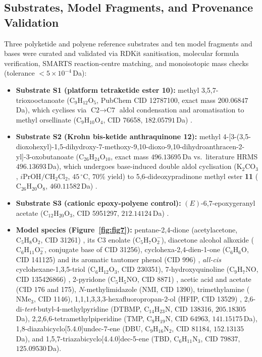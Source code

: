 \documentclass[11pt,a4paper]{article}
\begin{document}
\subsection{Substrates, Model Fragments, and Provenance Validation}
Three polyketide and polyene reference substrates and ten model fragments and bases were curated and validated via RDKit sanitisation, molecular formula verification, SMARTS reaction-centre matching, and monoisotopic mass checks (tolerance $< 5\times 10^{-4}$\,Da):
\begin{itemize}
\item \textbf{Substrate S1 (platform tetraketide ester \textbf{10}):} methyl 3,5,7-trioxooctanoate ($\text{C}_9\text{H}_{12}\text{O}_5$, PubChem CID 12787100, exact mass $200.06847$\,Da), which cyclises via $\text{C2}\to\text{C7}$ aldol condensation and aromatisation to methyl orsellinate ($\text{C}_9\text{H}_{10}\text{O}_4$, CID 76658, $182.05791$\,Da) \cite{harris1975,kleber2020}.
\item \textbf{Substrate S2 (Krohn bis-ketide anthraquinone \textbf{12}):} methyl 4-[3-(3,5-dioxohexyl)-1,5-dihydroxy-7-methoxy-9,10-dioxo-9,10-dihydroanthracen-2-yl]-3-oxobutanoate ($\text{C}_{26}\text{H}_{24}\text{O}_{10}$, exact mass $496.13695$\,Da vs.\ literature HRMS $496.13693$\,Da), which undergoes base-induced double aldol cyclisation ($\text{K}_2\text{CO}_3$, $i\text{PrOH}/\text{CH}_2\text{Cl}_2$, $45\,^\circ\text{C}$, $70\%$ yield) to 5,6-dideoxypradinone methyl ester \textbf{11} ($\text{C}_{26}\text{H}_{20}\text{O}_8$, $460.11582$\,Da) \cite{hayat1999,krohn2000}.
\item \textbf{Substrate S3 (cationic epoxy-polyene control):} $(E)$-6,7-epoxygeranyl acetate ($\text{C}_{12}\text{H}_{20}\text{O}_3$, CID 5951297, $212.14124$\,Da) \cite{corey1995,hess2017}.
\item \textbf{Model species (Figure~\ref{fig:fig7}):} pentane-2,4-dione (acetylacetone, $\text{C}_5\text{H}_8\text{O}_2$, CID 31261) \cite{alagona2010}, its C3 enolate ($\text{C}_5\text{H}_7\text{O}_2^-$), diacetone alcohol alkoxide ($\text{C}_6\text{H}_{11}\text{O}_2^-$, conjugate base of CID 31256), cyclohexa-2,4-dien-1-one ($\text{C}_6\text{H}_6\text{O}$, CID 141125) and its aromatic tautomer phenol (CID 996) \cite{capponi1986}, \textit{all-cis} cyclohexane-1,3,5-triol ($\text{C}_6\text{H}_{12}\text{O}_3$, CID 230351), 7-hydroxyquinoline ($\text{C}_9\text{H}_7\text{NO}$, CID 135426866) \cite{tanner2003}, 2-pyridone ($\text{C}_5\text{H}_5\text{NO}$, CID 8871) \cite{swain1952}, acetic acid and acetate (CID 176 and 175), $N$-methylimidazole (NMI, CID 1390), trimethylamine ($\text{NMe}_3$, CID 1146), 1,1,1,3,3,3-hexafluoropropan-2-ol (HFIP, CID 13529) \cite{colomer2017}, 2,6-di-\textit{tert}-butyl-4-methylpyridine (DTBMP, $\text{C}_{14}\text{H}_{23}\text{N}$, CID 138316, $205.18305$\,Da), 2,2,6,6-tetramethylpiperidine (TMP, $\text{C}_9\text{H}_{19}\text{N}$, CID 64963, $141.15175$\,Da), 1,8-diazabicyclo[5.4.0]undec-7-ene (DBU, $\text{C}_9\text{H}_{16}\text{N}_2$, CID 81184, $152.13135$\,Da), and 1,5,7-triazabicyclo[4.4.0]dec-5-ene (TBD, $\text{C}_6\text{H}_{11}\text{N}_3$, CID 79837, $125.09530$\,Da).
\end{itemize}
\end{document}
